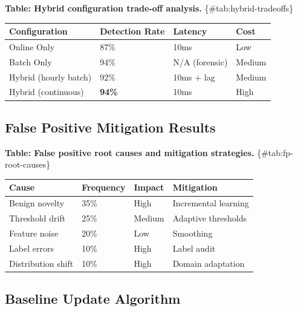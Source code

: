 \documentclass[
]{article}
\newcounter{none} %
\begin{document}
\textbf{Table: Hybrid configuration trade-off analysis.}
\{\#tab:hybrid-tradeoffs\}

{\def\LTcaptype{none} %
\begin{longtable}[]{@{}llll@{}}
\toprule\noalign{}
Configuration & Detection Rate & Latency & Cost \\
\midrule\noalign{}
\endhead
\bottomrule\noalign{}
\endlastfoot
Online Only & 87\% & 10ms & Low \\
Batch Only & 94\% & N/A (forensic) & Medium \\
Hybrid (hourly batch) & 92\% & 10ms + lag & Medium \\
Hybrid (continuous) & \textbf{94\%} & 10ms & High \\
\end{longtable}
}

\subsection{False Positive Mitigation
Results}\label{false-positive-mitigation-results}

\textbf{Table: False positive root causes and mitigation strategies.}
\{\#tab:fp-root-causes\}

{\def\LTcaptype{none} %
\begin{longtable}[]{@{}llll@{}}
\toprule\noalign{}
Cause & Frequency & Impact & Mitigation \\
\midrule\noalign{}
\endhead
\bottomrule\noalign{}
\endlastfoot
Benign novelty & 35\% & High & Incremental learning \\
Threshold drift & 25\% & Medium & Adaptive thresholds \\
Feature noise & 20\% & Low & Smoothing \\
Label errors & 10\% & High & Label audit \\
Distribution shift & 10\% & High & Domain adaptation \\
\end{longtable}
}

\subsection{Baseline Update Algorithm}\label{baseline-update-algorithm}
\end{document}
